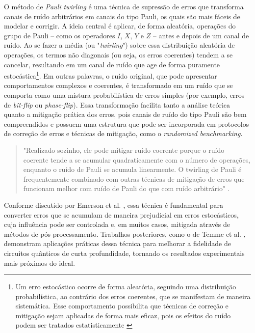 O m\'{e}todo de \textit{Pauli twirling} \'{e} uma t\'{e}cnica de supress\~{a}o de erros que transforma canais de ru\'{i}do arbitr\'{a}rios em canais do tipo Pauli, os quais s\~{a}o mais f\'{a}ceis de modelar e corrigir. A ideia central \'{e} aplicar, de forma aleatória, operaç\~{o}es do grupo de Pauli – como os operadores $I$, $X$, $Y$ e $Z$ – antes e depois de um canal de ru\'{i}do. Ao se fazer a m\'{e}dia (ou "\textit{twirling}") sobre essa distribuiç\~{a}o aleatória de operaç\~{o}es, os termos n\~{a}o diagonais (ou seja, os erros coerentes) tendem a se cancelar, resultando em um canal de ru\'{i}do que age de forma puramente estoc\'{a}stica\footnote{Um erro estoc\'{a}stico ocorre de forma aleatória, seguindo uma distribuiç\~{a}o probabil\'{i}stica, ao contr\'{a}rio dos erros coerentes, que se manifestam de maneira sistem\'{a}tica. Esse comportamento possibilita que t\'{e}cnicas de correç\~{a}o e mitigaç\~{a}o sejam aplicadas de forma mais eficaz, pois os efeitos do ru\'{i}do podem ser tratados estatisticamente \cite{Nielsen_Chuang2010_Livro}}.
Em outras palavras, o ru\'{i}do original, que pode apresentar comportamentos complexos e coerentes, \'{e} transformado em um ru\'{i}do que se comporta como uma mistura probabil\'{i}stica de erros simples (por exemplo, erros de \textit{bit-flip} ou \textit{phase-flip}). Essa transformaç\~{a}o facilita tanto a an\'{a}lise teórica quanto a mitigaç\~{a}o pr\'{a}tica dos erros, pois canais de ru\'{i}do do tipo Pauli s\~{a}o bem compreendidos e possuem uma estrutura que pode ser incorporada em protocolos de correç\~{a}o de erros e t\'{e}cnicas de mitigaç\~{a}o, como o \textit{randomized benchmarking}.
\begin{quote}
    
"Realizado sozinho, ele pode mitigar ru\'{i}do coerente porque o ru\'{i}do coerente tende a se acumular quadraticamente com o n\'{u}mero de operaç\~{o}es, enquanto o ru\'{i}do de Pauli se acumula linearmente. O twirling de Pauli \'{e} frequentemente combinado com outras t\'{e}cnicas de mitigaç\~{a}o de erros que funcionam melhor com ru\'{i}do de Pauli do que com ru\'{i}do arbitr\'{a}rio" \cite{IBM_PauliTwirling}.
\end{quote}
Conforme discutido por Emerson et al. \citeyear{emerson2005_PauliTwirling}, essa t\'{e}cnica \'{e} fundamental para converter erros que se acumulam de maneira prejudicial em erros estoc\'{a}sticos, cuja influ\^{e}ncia pode ser controlada e, em muitos casos, mitigada atrav\'{e}s de m\'{e}todos de pós-processamento. Trabalhos posteriores, como o de Temme et al.  \citeyear{temme2017_PauliTwirling}, demonstram aplicaç\~{o}es pr\'{a}ticas dessa t\'{e}cnica para melhorar a fidelidade de circuitos qu\^{a}nticos de curta profundidade, tornando os resultados experimentais mais próximos do ideal.

